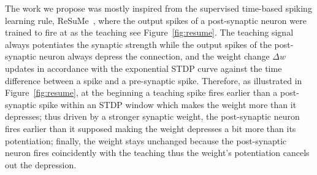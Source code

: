 The work we propose was mostly inspired from the supervised time-based spiking learning rule, ReSuMe~\citep{ponulak2010supervised}, where the output spikes of a post-synaptic neuron were trained to fire at \protect{} \protect{} as the teaching \protect{} \protect{} see Figure~\ref{fig:resume}.
The teaching signal always potentiates the synaptic strength while the output spikes of the post-synaptic neuron always depress the connection, and the weight change $\Delta w$ updates in accordance with the exponential STDP curve against the time difference between a spike and a pre-synaptic spike.
Therefore, as illustrated in Figure~\ref{fig:resume}, at the beginning a teaching spike fires earlier than a post-synaptic spike within an STDP window which makes the weight \protect{} \protect{} more than it depresses;
thus driven by a stronger synaptic weight, the post-synaptic neuron fires earlier than it \protect{} supposed \protect{} \protect{} making the weight depresses a bit more than its potentiation;
finally, the weight stays unchanged because the post-synaptic neuron fires coincidently with the teaching \protect{} \protect{} thus the weight's potentiation cancels out the depression.
